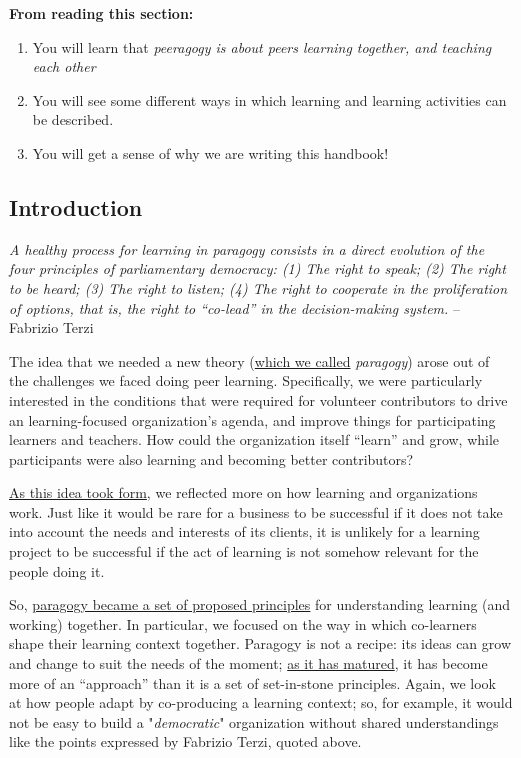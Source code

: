 \textbf{From reading this section:}

\begin{enumerate}
\item
  You will learn that \emph{peeragogy is about peers learning together,
  and teaching each other}
\item
  You will see some different ways in which learning and learning
  activities can be described.
\item
  You will get a sense of why we are writing this handbook!
\end{enumerate}
\subsection{Introduction}

\emph{A healthy process for learning in paragogy consists in a direct
evolution of the four principles of parliamentary democracy: (1) The
right to speak; (2) The right to be heard; (3) The right to listen; (4)
The right to cooperate in the proliferation of options, that is, the
right to ``co-lead'' in the decision-making system.} -- Fabrizio
Terzi\href{http://campus.ftacademy.org/community/mod/groups/topicposts.php?topic=10060\&group\_guid=8500}{}

The idea that we needed a new theory
(\href{http://archive.p2pu.org/general/node/5574/forums/9415\#comment-4054}{which
we called} \emph{paragogy}) arose out of the challenges we faced doing
peer learning. Specifically, we were particularly interested in the
conditions that were required for volunteer contributors to drive an
learning-focused organization's agenda, and improve things for
participating learners and teachers. How could the organization itself
``learn'' and grow, while participants were also learning and becoming
better contributors?

\href{http://archive.p2pu.org/general/node/15138/forums/25213}{As this
idea took form}, we reflected more on how learning and organizations
work. Just like it would be rare for a business to be successful if it
does not take into account the needs and interests of its clients, it is
unlikely for a learning project to be successful if the act of learning
is not somehow relevant for the people doing it.

So,
\href{http://en.wikiversity.org/wiki/File:Paragogy-final.pdf}{paragogy
became a set of proposed principles} for understanding learning (and
working) together. In particular, we focused on the way in which
co-learners shape their learning context together. Paragogy is not a
recipe: its ideas can grow and change to suit the needs of the moment;
\href{http://paragogy.net/ParagogyPaper2}{as it has matured}, it has
become more of an ``approach'' than it is a set of set-in-stone
principles. Again, we look at how people adapt by co-producing a
learning context; so, for example, it would not be easy to build a
"\emph{democratic}" organization without shared understandings like the
points expressed by Fabrizio Terzi, quoted above.

